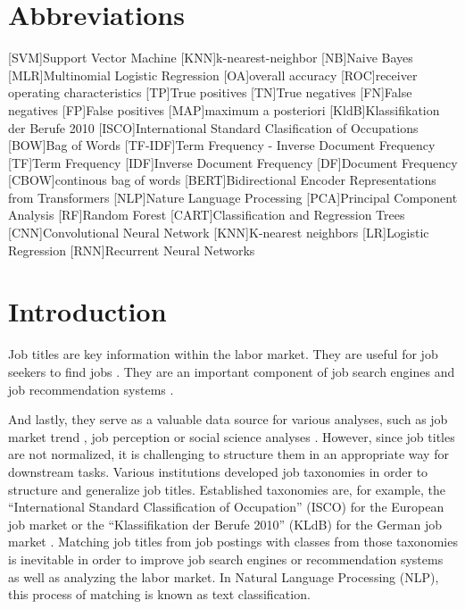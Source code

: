 \documentclass[12pt, a4paper, titlepage]{article}
\begin{document}
\section*{Abbreviations}
\begin{acronym}
  [SVM]{Support Vector Machine}
  [KNN]{k-nearest-neighbor}
  [NB]{Naive Bayes}
  [MLR]{Multinomial Logistic Regression}
  [OA]{overall accuracy}
  [ROC]{receiver operating characteristics}
  [TP]{True positives}
  [TN]{True negatives}
  [FN]{False negatives}
  [FP]{False positives}
  [MAP]{maximum a posteriori}
  [KldB]{Klassifikation der Berufe 2010}
  [ISCO]{International Standard Clasification of Occupations}
  [BOW]{Bag of Words}
  [TF-IDF]{Term Frequency - Inverse Document Frequency}
  [TF]{Term Frequency}
  [IDF]{Inverse Document Frequency}
  [DF]{Document Frequency}
  [CBOW]{continous bag of words}
  [BERT]{Bidirectional Encoder  Representations from Transformers}
  [NLP]{Nature Language Processing}
  [PCA]{Principal Component Analysis}
  [RF]{Random Forest}
  [CART]{Classification and Regression Trees}
  [CNN]{Convolutional Neural Network}
  [KNN]{K-nearest neighbors}
  [LR]{Logistic Regression}
  [RNN]{Recurrent Neural Networks}
\end{acronym}
\newpage

\section{Introduction}
Job titles are key information within the labor market. They are useful for job seekers to find jobs \citep{marinescu2020}. They are an important component of job search engines \citep{slamet2018, javed2015, javed2016} and job recommendation systems \citep{malherbe2014}. 

And lastly, they serve as a valuable data source for various analyses, such as job market trend \citep{martin2021, li2021}, job perception \citep{smith1989, boydston2020} or social science analyses \citep{martin2021}. However, since job titles are not normalized, it is challenging to structure them in an appropriate way for downstream tasks. Various institutions developed job taxonomies in order to structure and generalize job titles. Established taxonomies are, for example, the ``International Standard Classification of Occupation'' (ISCO) for the European job market or the ``Klassifikation der Berufe 2010'' (KLdB) for the German job market \citep{uter2020}. Matching job titles from job postings with classes from those taxonomies is inevitable in order to improve job search engines or recommendation systems as well as analyzing the labor market. In Natural Language Processing (NLP), this process of matching is known as text classification. 
\end{document}
